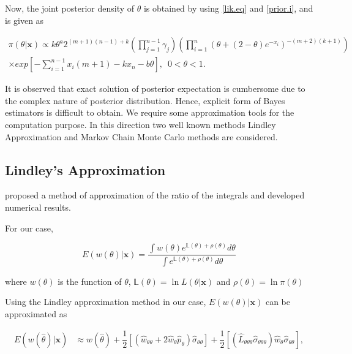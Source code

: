 \documentclass[11pt,a4paper]{article}
\numberwithin{equation}{section}
\begin{document}
	Now, the joint posterior density of $\theta$ is obtained by using \eqref{lik.eq} and \eqref{prior.i}, and is given as

	\begin{eqnarray}

		\pi(\theta|\boldsymbol{x})\propto  k\theta^{a}2^{(m+1)(n-1)+k}\left(\prod^{n-1}_{j=1}\gamma_j\right) \left(\prod^{n}_{i=1}\left(\theta+(2-\theta)e^{-x_{i}}\right)^{-(m+2)(k+1)}\right)\nonumber\\

		\times exp{\left[-\sum_{i=1}^{n-1}x_{i}(m+1)-kx_{n}-b\theta\right]},\,\,\, 0<\theta<1.

	\end{eqnarray} 

	

	It is observed that exact solution of posterior expectation is cumbersome due to the complex nature of posterior distribution. Hence, explicit form of Bayes estimators is difficult to obtain. We require some approximation tools for the computation purpose. In this direction two well known methods Lindley Approximation and Markov Chain Monte Carlo methods are considered. \par

	\subsection{Lindley's Approximation}

	\cite{lindley1980approximate} proposed a method of approximation of the ratio of the integrals and developed numerical results. 

	For our case, 

	\begin{equation}\label{lind.posterior}

		E(w(\theta)|\boldsymbol{x})=\dfrac{\int  w(\theta)e^{\mathbb{L}( \theta)+\rho( \theta)}d\theta}{\int e^{\mathbb{L}(\theta)+\rho( \theta)}d\theta}

	\end{equation}

	where $w(\theta)$ is the function of $\theta$, $\mathbb{L}( \theta)=\ln  L(\theta|\boldsymbol{x}) $ and $\rho( \theta)=\ln  \pi(\theta)$

	Using the Lindley approximation method in our case, $E(w(\theta)|\boldsymbol{x})$ can be approximated as

	\begin{align}\label{lind.bayesest}

		E(w( \hat{\theta})|\boldsymbol{x})&\approx w(\hat{\theta})+\dfrac{1}{2}\left[\left(\hat{w}_{\theta\theta}+2\hat{w}_{\theta}\hat{p}_{\theta}\right)\hat{\sigma}_{\theta\theta}\right]+\dfrac{1}{2}\left[\left(\hat{L}_{\theta\theta\theta}\hat{\sigma}_{\theta\theta\theta}\right)\hat{w}_{\theta}\hat{\sigma}_{\theta\theta}\right],

	\end{align}
\end{document}
